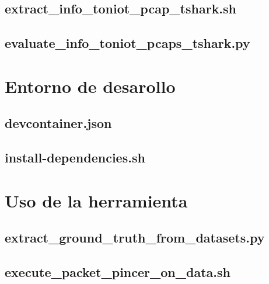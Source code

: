 \documentclass[11pt]{report}
\begin{document}
\section{extract\_info\_toniot\_pcap\_tshark.sh}


\section{evaluate\_info\_toniot\_pcaps\_tshark.py}


\chapter{Entorno de desarollo}
\section{devcontainer.json}


\section{install-dependencies.sh}


\chapter{Uso de la herramienta}
\section{extract\_ground\_truth\_from\_datasets.py}


\section{execute\_packet\_pincer\_on\_data.sh}

\end{document}
